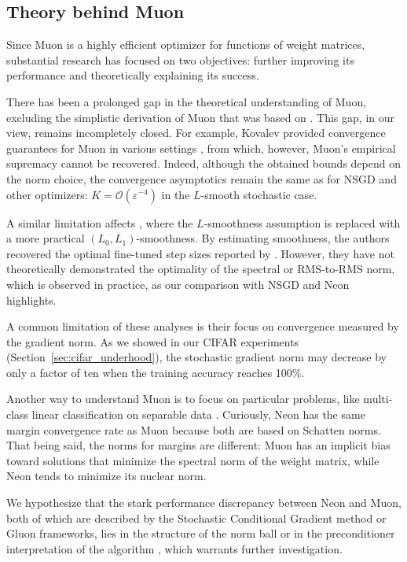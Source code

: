 \documentclass[a4paper,14pt,oneside]{extarticle}
\renewcommand{\epsilon}{\varepsilon}
\newcommand{\cO}{\mathcal{O}}
\newcommand{\sectionref}[1]{Section~\ref{#1}}
\begin{document}
\subsection{Theory behind Muon}
Since Muon \citep{jordan2024muon} is a highly efficient optimizer for functions of weight matrices, substantial research has focused on two objectives: further improving its performance and theoretically explaining its success.

There has been a prolonged gap in the theoretical understanding of Muon, excluding the simplistic derivation of Muon \citep{bernstein2025deriving} that was based on \citep{bernstein2024oldoptimizernewnorm}. This gap, in our view, remains incompletely closed. For example, Kovalev provided convergence guarantees for Muon in various settings \citep{kovalev2025understanding}, from which, however, Muon's empirical supremacy cannot be recovered. Indeed, although the obtained bounds depend on the norm choice, the convergence asymptotics remain the same as for NSGD and other optimizers: $K = \cO(\epsilon^{-4})$ in the $L$-smooth stochastic case.

A similar limitation affects \citep{riabinin2025gluon}, where the $L$-smoothness assumption is replaced with a more practical $(L_0, L_1)$-smoothness. By estimating smoothness, the authors recovered the optimal fine-tuned step sizes reported by \citep{pethick2025training}. However, they have not theoretically demonstrated the optimality of the spectral or RMS-to-RMS norm, which is observed in practice, as our comparison with NSGD and Neon highlights.

A common limitation of these analyses is their focus on convergence measured by the gradient norm. As we showed in our CIFAR experiments (\sectionref{sec:cifar_underhood}), the stochastic gradient norm may decrease by only a factor of ten when the training accuracy reaches 100\%.

Another way to understand Muon is to focus on particular problems, like multi-class linear classification on separable data \citep{fan2025implicit}. Curiously, Neon has the same margin convergence rate as Muon because both are based on Schatten norms. That being said, the norms for margins are different: Muon has an implicit bias toward solutions that minimize the spectral norm of the weight matrix, while Neon tends to minimize its nuclear norm.

We hypothesize that the stark performance discrepancy between Neon and Muon, both of which are described by the Stochastic Conditional Gradient method \citep{pethick2025training} or Gluon frameworks, lies in the structure of the norm ball or in the preconditioner interpretation of the algorithm \citep{pethick2025trainingneuralnetworksscale}, which warrants further investigation.
\end{document}
